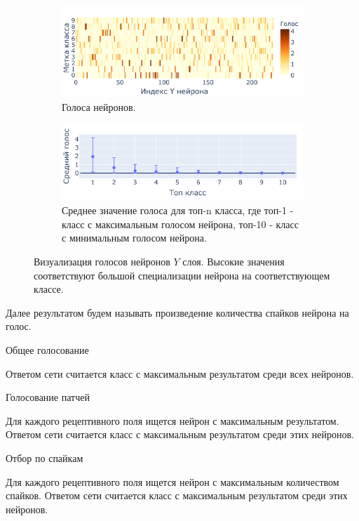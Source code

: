 \documentclass[a4paper]{article}
\begin{document}
\begin{figure}[H]
\centering
\begin{subfigure}{0.9\textwidth}
    \includegraphics[width=\textwidth,keepaspectratio=true]{votes_ru.pdf}
    \caption{Голоса нейронов.}
\end{subfigure} 
\begin{subfigure}{0.9\textwidth} 
    \includegraphics[width=\textwidth,keepaspectratio=true]{votes_distribution_ru.pdf}
    \caption{Среднее значение голоса для топ-n класса, где топ-1 - класс с максимальным голосом нейрона, топ-10 - класс с минимальным голосом нейрона.}
\end{subfigure}
\caption{Визуализация голосов нейронов $Y$ слоя. Высокие значения соответствуют большой специализации нейрона на соответствующем классе.}
\end{figure}

 Далее результатом будем называть произведение количества спайков нейрона на голос.

\begin{center}
 Общее голосование
\end{center}
Ответом сети считается класс с максимальным результатом среди всех нейронов.

\begin{center}
 Голосование патчей
\end{center}
Для каждого рецептивного поля ищется нейрон с максимальным результатом. Ответом сети считается класс с максимальным результатом среди этих нейронов. 

\begin{center}
 Отбор по спайкам
\end{center}
Для каждого рецептивного поля ищется нейрон с максимальным количеством спайков. Ответом сети считается класс с максимальным результатом среди этих нейронов.
\end{document}
